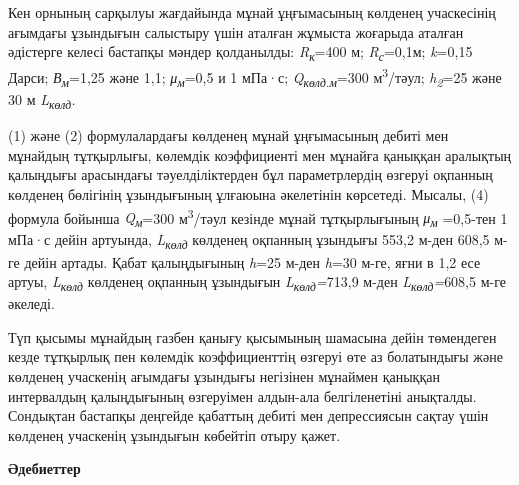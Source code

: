 \begin{multicols}{2}
Кен орнының сарқылуы жағдайында мұнай ұңғымасының көлденең учаскесінің
ағымдағы ұзындығын салыстыру үшін аталған жұмыста жоғарыда аталған
әдістерге келесі бастапқы мәндер қолданылды:
\emph{R\textsubscript{к}}=400 м; \emph{R\textsubscript{с}}=0,1м;
\emph{k}=0,15 Дарси; \emph{В\textsubscript{м}}=1,25 және 1,1;
\emph{μ\textsubscript{м}}=0,5 и 1 мПа·с;
\emph{Q\textsubscript{көлд.м}}=300 м\textsuperscript{3}/тәул;
\emph{h\textsubscript{2}}=25 және 30 м \emph{L\textsubscript{көлд}.}

(1) және (2) формулалардағы көлденең мұнай ұңғымасының дебиті мен
мұнайдың тұтқырлығы, көлемдік коэффициенті мен мұнайға қаныққан
аралықтың қалыңдығы арасындағы тәуелділіктерден бұл параметрлердің
өзгеруі оқпанның көлденең бөлігінің ұзындығының ұлғаюына әкелетінін
көрсетеді. Мысалы, (4) формула бойынша \emph{Q\textsubscript{м}}=300
м\textsuperscript{3}/тәул кезінде мұнай тұтқырлығының
\emph{μ\textsubscript{м}} =0,5-тен 1 мПа·с дейін артуында,
\emph{L\textsubscript{көлд }}көлденең оқпанның ұзындығы 553,2 м-ден
608,5 м-ге дейін артады. Қабат қалыңдығының \emph{h}=25 м-ден
\emph{h}=30 м-ге, яғни в 1,2 есе артуы, \emph{L\textsubscript{көлд}}
көлденең оқпанның ұзындығын \emph{L\textsubscript{көлд}=}713,9 м-ден
\emph{L\textsubscript{көлд}=}608,5 м-ге әкеледі.

Түп қысымы мұнайдың газбен қанығу қысымының шамасына дейін төмендеген
кезде тұтқырлық пен көлемдік коэффициенттің өзгеруі өте аз болатындығы
және көлденең учаскенің ағымдағы ұзындығы негізінен мұнаймен қаныққан
интервалдың қалыңдығының өзгеруімен алдын-ала белгіленетіні анықталды.
Сондықтан бастапқы деңгейде қабаттың дебиті мен депрессиясын сақтау үшін
көлденең учаскенің ұзындығын көбейтіп отыру қажет.
\end{multicols}

\begin{center}
	{\bfseries Әдебиеттер}
	\end{center}
	

